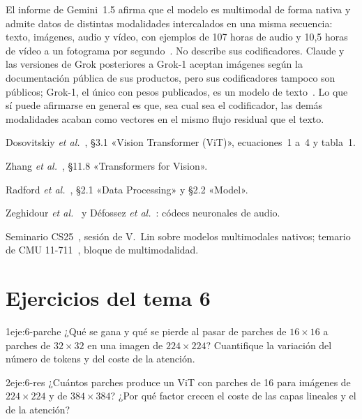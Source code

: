 \begin{observacion}
El informe de Gemini~1.5 afirma que el modelo es multimodal de forma nativa y admite datos de distintas modalidades intercalados en una misma secuencia: texto, imágenes, audio y vídeo, con ejemplos de 107 horas de audio y 10,5 horas de vídeo a un fotograma por segundo~\cite[§3.1]{gemini15}. No describe sus codificadores. Claude y las versiones de Grok posteriores a Grok-1 aceptan imágenes según la documentación pública de sus productos, pero sus codificadores tampoco son públicos; Grok-1, el único con pesos publicados, es un modelo de texto~\cite{grok1}. Lo que sí puede afirmarse en general es que, sea cual sea el codificador, las demás modalidades acaban como vectores en el mismo flujo residual que el texto.
\end{observacion}

\begin{lecturas}
\item Dosovitskiy \emph{et al.}~\cite{vit}, §3.1 «Vision Transformer (ViT)», ecuaciones~1 a~4 y tabla~1.
\item Zhang \emph{et al.}~\cite{d2l}, §11.8 «Transformers for Vision».
\item Radford \emph{et al.}~\cite{whisper}, §2.1 «Data Processing» y §2.2 «Model».
\item Zeghidour \emph{et al.}~\cite{soundstream} y Défossez \emph{et al.}~\cite{encodec}: códecs neuronales de audio.
\item Seminario CS25~\cite{cs25}, sesión de V.~Lin sobre modelos multimodales nativos; temario de CMU 11-711~\cite{cmu11711}, bloque de multimodalidad.
\end{lecturas}

\section*{Ejercicios del tema 6}

\begin{ejercicio}{1}{eje:6-parche}
¿Qué se gana y qué se pierde al pasar de parches de $16\times 16$ a parches de $32\times 32$ en una imagen de $224\times 224$? Cuantifique la variación del número de tokens y del coste de la atención.
\end{ejercicio}

\begin{ejercicio}{2}{eje:6-res}
¿Cuántos parches produce un ViT con parches de 16 para imágenes de $224\times 224$ y de $384\times 384$? ¿Por qué factor crecen el coste de las capas lineales y el de la atención?
\end{ejercicio}

